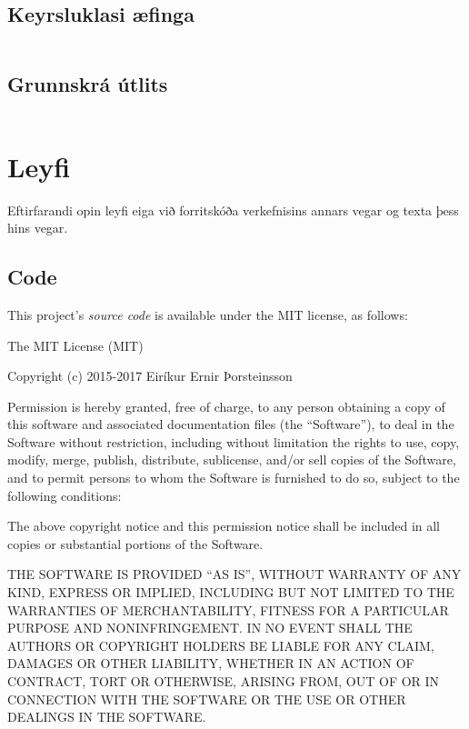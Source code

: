 \documentclass[a4paper,12pt,twoside,BCOR=10mm]{scrbook}
\begin{document}
\section{Keyrsluklasi æfinga}
\label{code:example-runner}
\inputminted[fontsize=\scriptsize, frame=lines, linenos=true, python3=true, label=sql_runner.py]{python}{../sql\string_web/sql\string_runner.py}
\section{Grunnskrá útlits}
\label{code:base-template}
\inputminted[fontsize=\scriptsize, frame=lines, linenos=true, label=base.html]{django}{../templates/base.html}

\chapter{Leyfi}
\label{sec:license}
Eftirfarandi opin leyfi eiga við forritskóða verkefnisins annars vegar og texta þess hins vegar.
\section{Code}\label{code}

This project's \emph{source code} is available under the MIT license, as
follows:

The MIT License (MIT)

Copyright (c) 2015-2017 Eiríkur Ernir Þorsteinsson

Permission is hereby granted, free of charge, to any person obtaining a
copy of this software and associated documentation files (the
``Software''), to deal in the Software without restriction, including
without limitation the rights to use, copy, modify, merge, publish,
distribute, sublicense, and/or sell copies of the Software, and to
permit persons to whom the Software is furnished to do so, subject to
the following conditions:

The above copyright notice and this permission notice shall be included
in all copies or substantial portions of the Software.

THE SOFTWARE IS PROVIDED ``AS IS'', WITHOUT WARRANTY OF ANY KIND,
EXPRESS OR IMPLIED, INCLUDING BUT NOT LIMITED TO THE WARRANTIES OF
MERCHANTABILITY, FITNESS FOR A PARTICULAR PURPOSE AND NONINFRINGEMENT.
IN NO EVENT SHALL THE AUTHORS OR COPYRIGHT HOLDERS BE LIABLE FOR ANY
CLAIM, DAMAGES OR OTHER LIABILITY, WHETHER IN AN ACTION OF CONTRACT,
TORT OR OTHERWISE, ARISING FROM, OUT OF OR IN CONNECTION WITH THE
SOFTWARE OR THE USE OR OTHER DEALINGS IN THE SOFTWARE.
\end{document}
